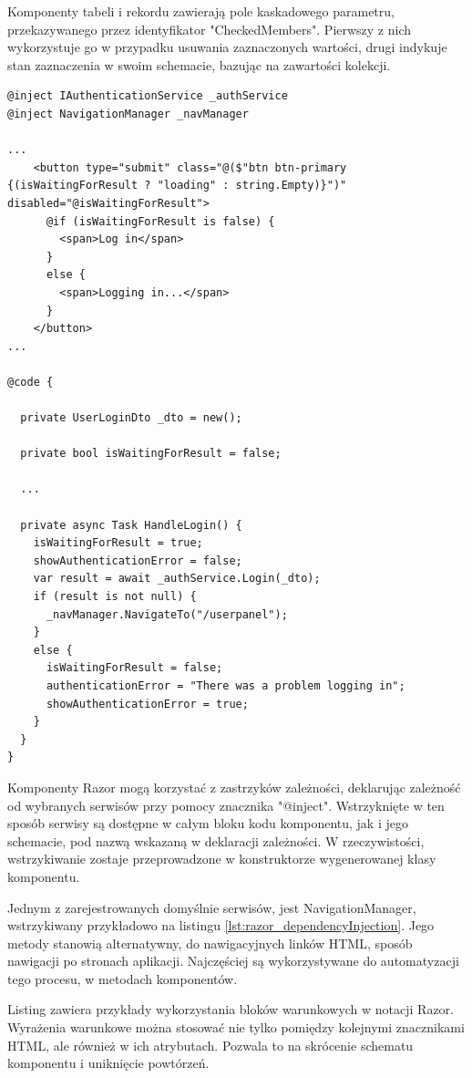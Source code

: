 Komponenty tabeli i rekordu zawierają pole kaskadowego parametru, przekazywanego przez identyfikator "CheckedMembers". Pierwszy z nich wykorzystuje go w przypadku usuwania zaznaczonych wartości, drugi indykuje stan zaznaczenia w swoim schemacie, bazując na zawartości kolekcji.

\begin{lstlisting}[language=CSharp, caption={Fragmenty komponentu logowania użytkownika, wykorzystujące zastrzyki zależności i bloki warunkowe}, label=lst:razor_dependencyInjection]
@inject IAuthenticationService _authService
@inject NavigationManager _navManager

...
    <button type="submit" class="@($"btn btn-primary {(isWaitingForResult ? "loading" : string.Empty)}")" disabled="@isWaitingForResult">
      @if (isWaitingForResult is false) {
        <span>Log in</span>
      }
      else {
        <span>Logging in...</span>
      }
    </button>
...

@code {

  private UserLoginDto _dto = new();

  private bool isWaitingForResult = false;
  
  ...

  private async Task HandleLogin() {
    isWaitingForResult = true;
    showAuthenticationError = false;
    var result = await _authService.Login(_dto);
    if (result is not null) {
      _navManager.NavigateTo("/userpanel");
    }
    else {
      isWaitingForResult = false;
      authenticationError = "There was a problem logging in";
      showAuthenticationError = true;
    }
  }
}
\end{lstlisting}

Komponenty Razor mogą korzystać z zastrzyków zależności, deklarując zależność od wybranych serwisów przy pomocy znacznika "@inject". Wstrzyknięte w ten sposób serwisy są dostępne w całym bloku kodu komponentu, jak i jego schemacie, pod nazwą wskazaną w deklaracji zależności. W rzeczywistości, wstrzykiwanie zostaje przeprowadzone w konstruktorze wygenerowanej klasy komponentu.

Jednym z zarejestrowanych domyślnie serwisów, jest NavigationManager, wstrzykiwany przykładowo na listingu \ref{lst:razor_dependencyInjection}. Jego metody stanowią alternatywny, do nawigacyjnych linków HTML, sposób nawigacji po stronach aplikacji. Najczęściej są wykorzystywane do automatyzacji tego procesu, w metodach komponentów.

Listing zawiera przykłady wykorzystania bloków warunkowych w notacji Razor. Wyrażenia warunkowe można stosować nie tylko pomiędzy kolejnymi znacznikami HTML, ale również w ich atrybutach. Pozwala to na skrócenie schematu komponentu i uniknięcie powtórzeń.

